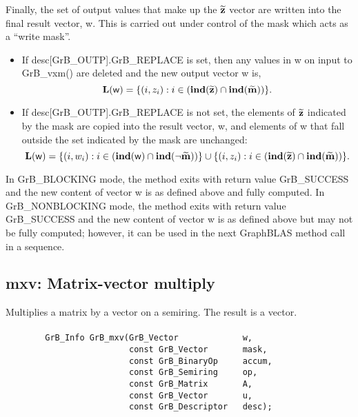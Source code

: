 Finally, the set of output values that make up the ${\bf \widetilde{z}}$ 
vector are written into the final result vector, {\sf w}. 
This is carried out under control of the mask which acts as a ``write mask''.
\begin{itemize}
\item If {\sf desc[GrB\_OUTP].GrB\_REPLACE} is set, then any values in {\sf w} 
on input to {\sf GrB\_vxm()} are deleted and the new output vector {\sf w} is,
\[ 
\bold{L}({\sf w}) = \{(i,z_{i}) : i \in (\bold{ind}({\bf \widetilde{z}}) 
\cap \bold{ind}({\bf \widetilde{m}})) \}. 
\]

\item If {\sf desc[GrB\_OUTP].GrB\_REPLACE} is not set, the elements of 
${\bf \widetilde{z}}$ indicated by the mask are copied into the result 
vector, {\sf w}, and elements of {\sf w} that fall outside the set indicated by 
the mask are unchanged:
\[ 
\bold{L}({\sf w}) = \{(i,w_{i}) : i \in (\bold{ind}({\bf \sf w}) 
\cap \bold{ind}(\neg {\bf \widetilde{m}})) \} \cup \{(i,z_{i}) : i \in 
(\bold{ind}({\bf \widetilde{z}}) \cap \bold{ind}({\bf \widetilde{m}})) \}. 
\]
\end{itemize}

In {\sf GrB\_BLOCKING} mode, the method exits with return value 
{\sf GrB\_SUCCESS} and the new content of vector {\sf w} is as defined above
and fully computed.  
In {\sf GrB\_NONBLOCKING} mode, the method exits with return value 
{\sf GrB\_SUCCESS} and the new content of vector {\sf w} is as defined above 
but may not be fully computed; however, it can be used in the next GraphBLAS 
method call in a sequence.



\subsection{{\sf mxv}: Matrix-vector multiply}

Multiplies a matrix by a vector on a semiring. The result is a vector.

\paragraph{\syntax}

\begin{verbatim}
        GrB_Info GrB_mxv(GrB_Vector             w,
                         const GrB_Vector       mask,
                         const GrB_BinaryOp     accum,
                         const GrB_Semiring     op, 
                         const GrB_Matrix       A,
                         const GrB_Vector       u,
                         const GrB_Descriptor   desc);
\end{verbatim}

